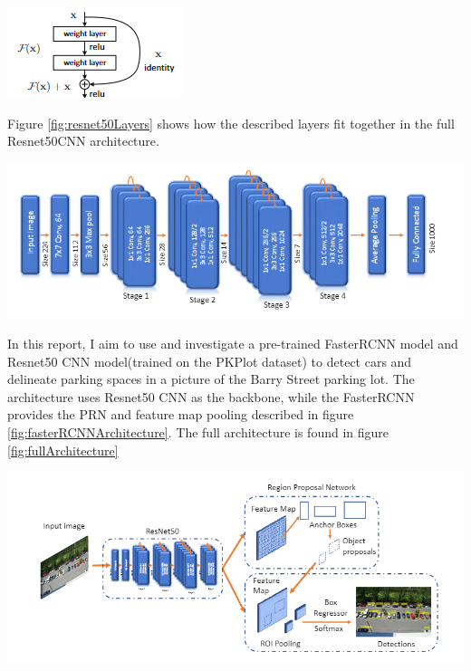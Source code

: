 \documentclass[man]{apa7}
\begin{document}
\begin{minipage}{\linewidth}
  \includegraphics[height=\textheight/6 ,width=\textwidth/4]{figures/resnet.png}
  \label{fig:resnet50}
\end{minipage}

Figure \ref{fig:resnet50Layers} shows how the described layers fit together in the full Resnet50CNN architecture.
\begin{minipage}{\linewidth}
  \includegraphics[width=\textwidth]{figures/resnetLayers.png}
  \label{fig:resnet50Layers}
\end{minipage}

In this report, I aim to use and investigate a pre-trained FasterRCNN model and Resnet50 CNN model(trained on the PKPlot dataset) to detect cars and delineate parking spaces in a picture of the Barry Street parking lot. The architecture uses Resnet50 CNN as the backbone, while the FasterRCNN provides the PRN and feature map pooling described in figure \ref{fig:fasterRCNNArchitecture}. The full architecture is found in figure \ref{fig:fullArchitecture}

\begin{minipage}{\linewidth}
  \includegraphics[width=\textwidth]{figures/fullArchitecture.png}
  \label{fig:fullArchitecture}
\end{minipage}
\end{document}
